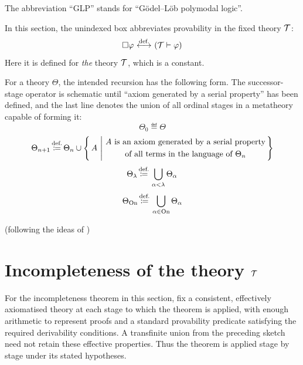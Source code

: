 The abbreviation ``GLP'' stands for ``G\"odel--L\"ob polymodal logic''.
\begin{notation}[provability]%
In this section, the unindexed box abbreviates provability in the fixed
theory $\mathcal{T}$:
\[
\square\varphi
\ {\stackrel{{\textrm{def.}}}{\longleftrightarrow}}\ 
(\mathcal{T} \vdash \varphi)
\]
Here it is defined for \textit{the} theory $\mathcal{T}$, which is a constant.%
\end{notation}

\begin{definition}%
For a theory $\Theta$, the intended recursion has the following form.
The successor-stage operator is schematic until ``axiom generated by a
serial property'' has been defined, and the last line denotes the union of
all ordinal stages in a metatheory capable of forming it:
\[
\Theta_0 \eqdef \Theta
\]
\[
\Theta_{n+1} \,{\stackrel{{\textrm{def.}}}{\coloneqq}}\, \Theta_n\cup\left\{\,A\ \middle|\ \begin{gathered}
A\text{ is an axiom generated by a serial property}\\
\text{of all terms in the language of $\Theta_n$}
\end{gathered}\,\right\}
\]
\[
\Theta_{\lambda} \,{\stackrel{{\textrm{def.}}}{\coloneqq}}\, \bigcup_{\alpha<\lambda}\Theta_\alpha
\]
\[
\Theta_{\mathrm{On}} \,{\stackrel{{\textrm{def.}}}{\coloneqq}}\, \bigcup_{\alpha\in\mathrm{On}}\Theta_\alpha
\]

(following the ideas of \cite{Japaridze1986})
\end{definition}
\pagebreak
\section{\texorpdfstring{Incompleteness of the theory $\mathcal{T}$}{Incompleteness of the theory Tau}}
For the incompleteness theorem in this section, fix a consistent,
effectively axiomatised theory at each stage to which the theorem is applied,
with enough arithmetic to represent proofs and a standard provability
predicate satisfying the required derivability conditions. A transfinite
union from the preceding sketch need not retain these effective properties.
Thus the theorem is applied stage by stage under its stated hypotheses.

